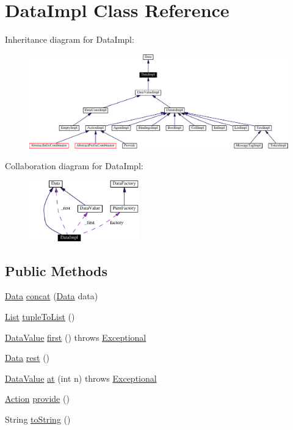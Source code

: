 \hypertarget{classDataImpl}{
\section{Data\-Impl  Class Reference}
\label{classDataImpl}
}
Inheritance diagram for Data\-Impl:\begin{figure}[H]
\begin{center}
\leavevmode
\includegraphics[width=381pt]{classDataImpl__inherit__graph}
\end{center}
\end{figure}
Collaboration diagram for Data\-Impl:\begin{figure}[H]
\begin{center}
\leavevmode
\includegraphics[width=134pt]{classDataImpl__coll__graph}
\end{center}
\end{figure}
\subsection*{Public Methods}
\begin{CompactItemize}
\item 
\hyperlink{interfaceData}{Data} \hyperlink{classDataImpl_a0}{concat} (\hyperlink{interfaceData}{Data} data)
\item 
\hyperlink{interfaceList}{List} \hyperlink{classDataImpl_a1}{tuple\-To\-List} ()
\item 
\hyperlink{interfaceDataValue}{Data\-Value} \hyperlink{classDataImpl_a2}{first} () throws \hyperlink{classExceptional}{Exceptional}
\item 
\hyperlink{interfaceData}{Data} \hyperlink{classDataImpl_a3}{rest} ()
\item 
\hyperlink{interfaceDataValue}{Data\-Value} \hyperlink{classDataImpl_a4}{at} (int n) throws \hyperlink{classExceptional}{Exceptional}
\item 
\hyperlink{interfaceAction}{Action} \hyperlink{classDataImpl_a5}{provide} ()
\item 
String \hyperlink{classDataImpl_a6}{to\-String} ()
\end{CompactItemize}
